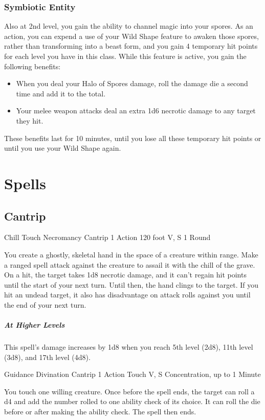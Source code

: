 {\subsubsection*{Symbiotic Entity}
Also at 2nd level, you gain the ability to channel magic into your spores. As an action, you can expend a use of your Wild Shape feature to awaken those spores, rather than transforming into a beast form, and you gain 4 temporary hit points for each level you have in this class. While this feature is active, you gain the following benefits:
\begin{itemize}
	\item When you deal your Halo of Spores damage, roll the damage die a second time and add it to the total.
	\item Your melee weapon attacks deal an extra 1d6 necrotic damage to any target they hit.
\end{itemize}
These benefits last for 10 minutes, until you lose all these temporary hit points or until you use your Wild Shape again.

\section*{Spells}
\subsection*{Cantrip}

\DndSpellHeader
  {Chill Touch}
  {Necromancy Cantrip}
  {1 Action}
  {120 foot}
  {V, S}
  {1 Round}

You create a ghostly, skeletal hand in the space of a creature within range. Make a ranged spell attack against the creature to assail it with the chill of the grave. On a hit, the target takes 1d8 necrotic damage, and it can’t regain hit points until the start of your next turn. Until then, the hand clings to the target. If you hit an undead target, it also has disadvantage on attack rolls against you until the end of your next turn.

\subparagraph*{At Higher Levels} This spell’s damage increases by 1d8 when you reach 5th level (2d8), 11th level (3d8), and 17th level (4d8).

\DndSpellHeader
  {Guidance}
  {Divination Cantrip}
  {1 Action}
  {Touch}
  {V, S}
  {Concentration, up to 1 Minute}

You touch one willing creature. Once before the spell ends, the target can roll a d4 and add the number rolled to one ability check of its choice. It can roll the die before or after making the ability check. The spell then ends.

}
